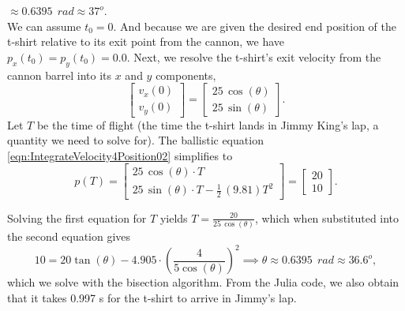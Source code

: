 \solution \Ans  $\approx 0.6395 ~~rad \approx  37^o$.\\

We can assume $t_0=0$. And because we are given the desired end position of the t-shirt relative to its exit point from the cannon, we have $p_x(t_0)=p_y(t_0)=0.0$. Next, we resolve the t-shirt's exit velocity from the cannon barrel into its $x$ and $y$ components,
$$\left[\begin{array}{c} v_x(0) \\ v_y(0) \end{array}
\right] = \left[\begin{array}{c} 25 \, \cos(\theta) \\ 25 \, \sin(\theta) \end{array}
\right].$$
Let $T$ be the time of flight (the time the t-shirt lands in Jimmy King's lap, a quantity we need to solve for). The ballistic equation \eqref{eqn:IntegrateVelocity4Position02} simplifies to
\begin{equation}
\label{eqn:tshirtCannonBallisticPath}
    p(T) = 
      \left[\begin{array}{l}  25 \, \cos(\theta) \cdot T \\[1em]  
  25 \, \sin(\theta) \cdot T - \frac{1}{2}  \, (9.81) T^2\end{array} \right] = \left[\begin{array}{l}  20\\[1em]  
  10\end{array} \right].
\end{equation}

Solving the first equation for $T$ yields $T= \frac{20}{25\, \cos(\theta)}$, which when substituted into the second equation gives
$$10 = 20 \tan(\theta) -  4.905 \cdot \left(\frac{4}{5 \cos(\theta)} \right)^2 \implies \theta \approx 0.6395 ~~rad \approx  36.6^o,$$
which we solve with the bisection algorithm. From the Julia code, we also obtain that it takes 0.997 s for the t-shirt to arrive in Jimmy's lap. 

\bigskip

